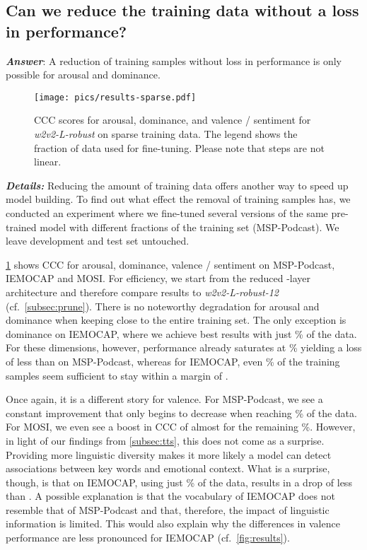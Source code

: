 \documentclass{article}
\newcommand\wrobust{\mbox{\emph{w2v2-L-robust}}}
\newcommand\wrobustpruned{\mbox{\emph{w2v2-L-robust-12}}}
\newcommand\msppodcast{\mbox{MSP-Podcast}}
\newcommand\iemocap{\mbox{IEMOCAP}}
\newcommand\mosi{\mbox{MOSI}}
\newcommand{\cf}{{cf.\ }}
\begin{document}
\subsection{Can we reduce the training data without a loss in performance?}
\label{subsec:data_reduction}

\emph{\textbf{Answer}}:
A reduction of training samples without loss in performance is only possible for arousal and dominance.

\begin{figure}[t]
    \centering
    \texttt{[image: pics/results-sparse.pdf]}
    \caption{
        \ac{CCC} scores for arousal, dominance, and valence / sentiment for \emph{\wrobust} on sparse training data.
        The legend shows the fraction of data used for fine-tuning.
        Please note that steps are not linear.
    }
    \label{fig:sparse}
\end{figure}

\noindent
\emph{\textbf{Details:}}
Reducing the amount of training data offers another way to speed up model building. 
To find out what effect the removal of training samples has,
we conducted an experiment where we fine-tuned several versions of the same pre-trained model
with different fractions of the training set ({\msppodcast}). 
We leave development and test set untouched.

\cref{fig:sparse} shows \ac{CCC}
for arousal, dominance, valence / sentiment on {\msppodcast}, {\iemocap} and {\mosi}.
For efficiency, we start from the reduced -layer architecture and therefore compare results to {\wrobustpruned} (\cf \cref{subsec:prune}).
There is no noteworthy degradation for arousal and dominance when keeping close to the entire training set.
The only exception is dominance on {\iemocap}, where we achieve best results with just \% of the data. 
For these dimensions, however, performance already saturates at \% yielding a loss of less than  on {\msppodcast},
whereas for {\iemocap}, even \% of the training samples seem sufficient to stay within a margin of .

Once again, it is a different story for valence. 
For {\msppodcast}, we see a constant improvement that only begins to decrease when reaching \% of the data. For {\mosi}, we even see a boost in \ac{CCC} of almost  for the remaining \%. 
However, in light of our findings from \cref{subsec:tts}, 
this does not come as a surprise. 
Providing more linguistic diversity makes it more likely a model can detect associations between key words and emotional context. 
What is a surprise, though, is that on {\iemocap}, using just \% of the data, results in a drop of less than . 
A possible explanation is that the vocabulary of {\iemocap} does not resemble that of {\msppodcast} and that, therefore, the impact of linguistic information is limited. 
This would also explain why the differences in valence performance are less pronounced for {\iemocap} (\cf \cref{fig:results}).
\end{document}
